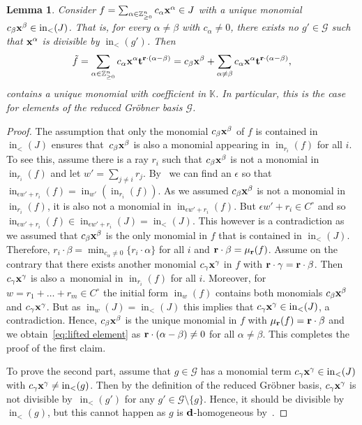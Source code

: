 \documentclass[pdftex]{sigma}%
\newtheorem{Lemma}[Theorem]{Lemma}
\numberwithin{equation}{section}
\DeclareMathOperator{\init}{in}
\begin{document}
\begin{Lemma}
Consider $f=\sum_{\alpha \in \mathbb Z^n_{\ge 0}} c_\alpha{\bf x}^\alpha\in J$ with a unique monomial $c_\beta{\bf x}^\beta\in \init_<(J)$. That is, for every $\alpha\neq\beta$ with $c_\alpha\neq 0$, there exists no $g'\in\mathcal G$ such that ${\bf x}^\alpha$ is divisible by $\init_<(g')$.
Then
\begin{equation}\label{eq:lifted element}
\tilde f = \sum_{\alpha \in \mathbb Z^n_{\ge 0}} c_\alpha {\bf x}^{\alpha} {\bf t}^{{\bf r}\cdot(\alpha -\beta)} = c_\beta {\bf x}^{\beta} + \sum_{\alpha\not=\beta} c_\alpha{\bf x}^{\alpha}{\bf t}^{{\bf r}\cdot (\alpha-\beta)},
\end{equation}
contains a unique monomial with coefficient in $\mathbb K$.
In particular, this is the case for elements of the reduced Gr\"obner basis $\mathcal G$.
\end{Lemma}
\begin{proof}
The assumption that only the monomial $c_\beta{\bf x}^\beta$ of $f$ is contained in $\init_<(J)$ ensures that~$c_\beta{\bf x}^\beta$ is also a monomial appearing in $\init_{r_i}(f)$ for all $i$. To see this, assume there is a ray $r_i$ such that $c_\beta{\bf x}^\beta$ is not a monomial in $\init_{r_i}(f)$ and let $w'=\sum_{j\not=i} r_j$. By~\cite[Lemma~2.4.5]{M-S} we can find an $\epsilon$ so that $\init_{\epsilon w'+r_i}(f)=\init_{w'}(\init_{r_i}(f))$. As we assumed $c_\beta{\bf x}^\beta$ is not a monomial in $\init_{r_i}(f)$, it is also not a monomial in $\init_{\epsilon w'+r_i}(f)$. But $\epsilon w'+r_i\in C^\circ$ and so $\init_{\epsilon w'+r_i}(f)\in \init_{\epsilon w'+r_i}(J)=\init_<(J)$. This however is a contradiction as we assumed that $c_\beta{\bf x}^\beta$ is the only monomial in $f$ that is contained in $\init_<(J)$.
Therefore, $r_i\cdot\beta=\min_{c_\alpha\not =0}\{r_i\cdot \alpha\}$ for all $i$ and ${\bf r}\cdot \beta=\mu_{\bf r}(f)$.
Assume on the contrary that there exists another monomial $c_\gamma{\bf x}^\gamma$ in $f$ with ${\bf r}\cdot\gamma={\bf r}\cdot\beta$.
Then $c_\gamma{\bf x}^\gamma$ is also a~monomial in $\init_{r_i}(f)$ for all $i$.
Moreover, for $w=r_1+\dots+r_m\in C^\circ$ the initial form $\init_w(f)$ contains both monomials $c_\beta{\bf x}^\beta$ and $c_\gamma{\bf x}^\gamma$.
But as $\init_w(J)=\init_<(J)$ this implies that $c_\gamma{\bf x}^\gamma\in \init_<(J)$, a contradiction.
Hence, $c_\beta{\bf x}^\beta$ is the unique monomial in $f$ with $\mu_{\bf r}(f)={\bf r}\cdot \beta$ and we obtain~\eqref{eq:lifted element} as ${\bf r}\cdot(\alpha-\beta)\not=0$ for all $\alpha\not=\beta$. This completes the proof of the first claim.

To prove the second part, assume that $g\in\mathcal{G}$ has a monomial term $c_\gamma{\bf x}^{\gamma}\in \init_<(J)$ with $c_\gamma{\bf x}^{\gamma}\neq \init_<(g)$.
Then by the definition of the reduced Gr\"obner basis, $c_\gamma{\bf x}^{\gamma}$ is not divisible by~$\init_<(g')$ for any $g'\in \mathcal G\setminus \{g\}$.
Hence, it should be divisible by~$\init_<(g)$, but this cannot happen as $g$ is ${\bf d}$-homogeneous by~.
\end{proof}
\end{document}
